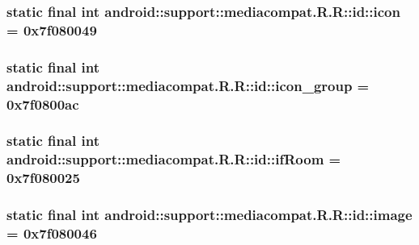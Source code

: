 \hypertarget{classandroid_1_1support_1_1mediacompat_1_1_r_1_1id_3a932473fa447d72d5780851eef9f1a4}{
\subsubsection[{icon}]{\setlength{\rightskip}{0pt plus 5cm}static final int android::support::mediacompat.R.R::id::icon = 0x7f080049}}
\label{classandroid_1_1support_1_1mediacompat_1_1_r_1_1id_3a932473fa447d72d5780851eef9f1a4}


\hypertarget{classandroid_1_1support_1_1mediacompat_1_1_r_1_1id_4c293a61f150d6ae6aab6ad96437ac58}{
\subsubsection[{icon\_\-group}]{\setlength{\rightskip}{0pt plus 5cm}static final int android::support::mediacompat.R.R::id::icon\_\-group = 0x7f0800ac}}
\label{classandroid_1_1support_1_1mediacompat_1_1_r_1_1id_4c293a61f150d6ae6aab6ad96437ac58}


\hypertarget{classandroid_1_1support_1_1mediacompat_1_1_r_1_1id_d00c1f655663a0492b1acf75a0f519f7}{
\subsubsection[{ifRoom}]{\setlength{\rightskip}{0pt plus 5cm}static final int android::support::mediacompat.R.R::id::ifRoom = 0x7f080025}}
\label{classandroid_1_1support_1_1mediacompat_1_1_r_1_1id_d00c1f655663a0492b1acf75a0f519f7}


\hypertarget{classandroid_1_1support_1_1mediacompat_1_1_r_1_1id_c1860019997938fdeb495af5af8c6ad5}{
\subsubsection[{image}]{\setlength{\rightskip}{0pt plus 5cm}static final int android::support::mediacompat.R.R::id::image = 0x7f080046}}
\label{classandroid_1_1support_1_1mediacompat_1_1_r_1_1id_c1860019997938fdeb495af5af8c6ad5}


